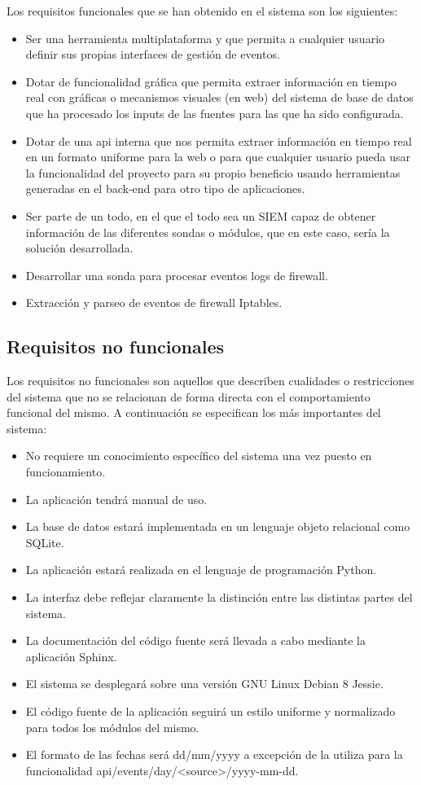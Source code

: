 Los requisitos funcionales que se han obtenido en el sistema son los siguientes:

\begin{itemize}
\item Ser una herramienta multiplataforma y que permita a cualquier usuario definir sus propias interfaces de gestión de eventos.
\item Dotar de funcionalidad gráfica que permita extraer información en tiempo real con gráficas o mecanismos visuales (en web) del sistema de base de datos que ha procesado los inputs de las fuentes para las que ha sido configurada.
\item Dotar de una api interna que nos permita extraer información en tiempo real en un formato uniforme para la web o para que cualquier usuario pueda usar la funcionalidad del proyecto para su propio beneficio usando herramientas generadas en el back-end para otro tipo de aplicaciones.
\item Ser parte de un todo, en el que el todo sea un SIEM capaz de obtener información de las diferentes sondas o módulos, que en este caso, sería la solución desarrollada.
\item Desarrollar una sonda para procesar eventos logs de firewall.
\item Extracción y parseo de eventos de firewall Iptables.
\end{itemize}

\subsection{Requisitos no funcionales}

Los requisitos no funcionales son aquellos que describen cualidades o restricciones del sistema que no se relacionan de forma directa con el comportamiento funcional del mismo. A continuación se especifican los más importantes del sistema:
\begin{itemize}
\item No requiere un conocimiento específico del sistema una vez puesto en funcionamiento.
\item La aplicación tendrá manual de uso.
\item La base de datos estará implementada en un lenguaje objeto relacional como SQLite.
\item La aplicación estará realizada en el lenguaje de programación Python.
\item La interfaz debe reflejar claramente la distinción entre las distintas partes del sistema.
\item La documentación del código fuente será llevada a cabo mediante la aplicación Sphinx.
\item El sistema se desplegará sobre una versión GNU Linux Debian 8 Jessie.
\item El código fuente de la aplicación seguirá un estilo uniforme y normalizado para todos los módulos del mismo.
\item El formato de las fechas será dd/mm/yyyy a excepción de la utiliza para la funcionalidad api/events/day/<source>/yyyy-mm-dd.
\end{itemize}
